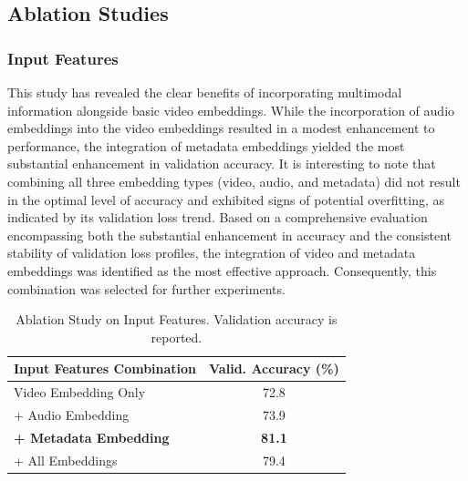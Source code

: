 \subsection{Ablation Studies}

\subsubsection{Input Features}


This study has revealed the clear benefits of incorporating multimodal information alongside basic video embeddings.
While the incorporation of audio embeddings into the video embeddings resulted in a modest enhancement to performance, the integration of metadata embeddings yielded the most substantial enhancement in validation accuracy.
It is interesting to note that combining all three embedding types (video, audio, and metadata) did not result in the optimal level of accuracy and exhibited signs of potential overfitting, as indicated by its validation loss trend.
Based on a comprehensive evaluation encompassing both the substantial enhancement in accuracy and the consistent stability of validation loss profiles, the integration of video and metadata embeddings was identified as the most effective approach.
Consequently, this combination was selected for further experiments.

\begin{table}[hbt!]
\centering
\caption{Ablation Study on Input Features. Validation accuracy is reported.}
\label{tab:input_ablation}
\small %
\begin{tabular}{lc}
\toprule
Input Features Combination & Valid. Accuracy (\%) \\
\midrule
Video Embedding Only & 72.8 \\
+ Audio Embedding  & 73.9 \\
\textbf{+ Metadata Embedding} & \textbf{81.1} \\
+ All Embeddings& 79.4 \\
\bottomrule
\end{tabular}
\end{table}

